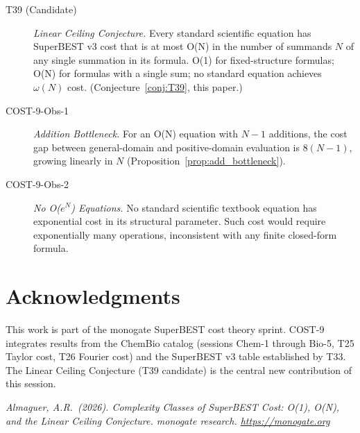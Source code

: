 \documentclass[12pt,a4paper]{article}
\theoremstyle{definition}
\begin{document}
\begin{description}
  \item[T39 (Candidate)] \emph{Linear Ceiling Conjecture.}
        Every standard scientific equation has SuperBEST v3 cost that
        is at most O(N) in the number of summands $N$ of any single
        summation in its formula.  O(1) for fixed-structure formulas;
        O(N) for formulas with a single sum; no standard equation
        achieves $\omega(N)$ cost.
        (Conjecture~\ref{conj:T39}, this paper.)

  \item[COST-9-Obs-1] \emph{Addition Bottleneck.}
        For an O(N) equation with $N-1$ additions, the cost gap
        between general-domain and positive-domain evaluation is
        $8(N-1)$, growing linearly in $N$
        (Proposition~\ref{prop:add_bottleneck}).

  \item[COST-9-Obs-2] \emph{No O($e^N$) Equations.}
        No standard scientific textbook equation has exponential cost
        in its structural parameter.  Such cost would require
        exponentially many operations, inconsistent with any finite
        closed-form formula.
\end{description}

\section*{Acknowledgments}

This work is part of the monogate SuperBEST cost theory sprint.
COST-9 integrates results from the ChemBio catalog (sessions Chem-1
through Bio-5, T25 Taylor cost, T26 Fourier cost) and the
SuperBEST v3 table established by T33.  The Linear Ceiling Conjecture
(T39 candidate) is the central new contribution of this session.

\bigskip
\noindent\textit{Almaguer, A.R.\ (2026).
Complexity Classes of SuperBEST Cost: O(1), O(N), and the Linear Ceiling Conjecture.
monogate research. \url{https://monogate.org}}
\end{document}
